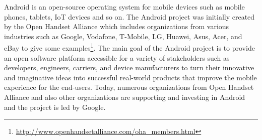 Android is an open-source operating system for mobile devices such as mobile phones, tablets, IoT devices and so on. The Android project was initially created by the Open Handset Alliance which includes organizations from various industries such as Google, Vodafone, T-Mobile, LG, Huawei, Asus, Acer, and eBay to give some examples\footnote{\url{http://www.openhandsetalliance.com/oha_members.html}}. The main goal of the Android project is to provide an open software platform accessible for a variety of stakeholders such as developers, engineers, carriers, and device manufacturers to turn their innovative and imaginative ideas into successful real-world products that improve the mobile experience for the end-users. Today, numerous organizations from Open Handset Alliance and also other organizations are supporting and investing in Android and the project is led by Google.